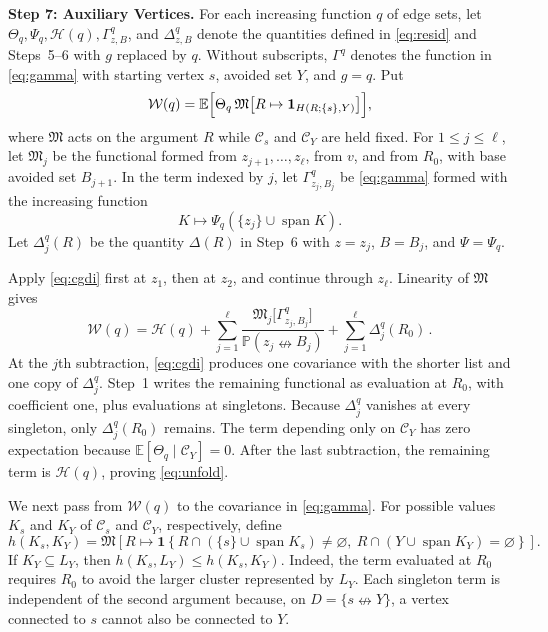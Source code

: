\documentclass[11pt]{article}
\theoremstyle{definition}
\theoremstyle{remark}
\newcommand{\PP}{\mathbb P}
\newcommand{\EE}{\mathbb E}
\newcommand{\one}{\mathbf 1}
\newcommand{\ncon}{\nleftrightarrow}
\newcommand{\eC}{\mathcal C}
\DeclareMathOperator{\spn}{span}
\newcommand{\Marg}{\mathfrak M}
\begin{document}
\medskip\noindent\textbf{Step 7: Auxiliary Vertices.}
For each increasing function $q$ of edge sets, let
$\Theta_q,\Psi_q,\mathcal H(q),\Gamma^q_{z,B}$, and $\Delta^q_{z,B}$ denote the quantities
defined in \eqref{eq:resid} and Steps~5--6 with $g$ replaced by $q$. Without subscripts,
$\Gamma^q$ denotes the function in \eqref{eq:gamma} with starting vertex $s$, avoided set
$Y$, and $g=q$. Put
\[
 \mathcal W(q)=\EE\Bigl[\Theta_q\,
   \Marg\bigl[R\mapsto\one_{H(R;\{s\},Y)}\bigr]\Bigr],
\]
where $\Marg$ acts on the argument $R$ while $\eC_s$ and $\eC_Y$ are held fixed. For
$1\leq j\leq\ell$, let $\Marg_j$ be the functional formed from
$z_{j+1},\ldots,z_\ell$, from $v$, and from $R_0$, with base avoided set $B_{j+1}$. In
the term indexed by $j$, let $\Gamma^q_{z_j,B_j}$ be \eqref{eq:gamma} formed with the
increasing function
\[
 K\longmapsto\Psi_q(\{z_j\}\cup\spn K).
\]
Let $\Delta^q_j(R)$ be the quantity $\Delta(R)$ in Step~6 with $z=z_j$, $B=B_j$, and
$\Psi=\Psi_q$.

Apply \eqref{eq:cgdi} first at $z_1$, then at $z_2$, and continue through $z_\ell$.
Linearity of $\Marg$ gives
\begin{equation}\label{eq:unfold}
 \mathcal W(q)=\mathcal H(q)
 +\sum_{j=1}^{\ell}\frac{\Marg_j\bigl[\Gamma^q_{z_j,B_j}\bigr]}{\PP(z_j\ncon B_j)}
 +\sum_{j=1}^{\ell}\Delta^q_j(R_0)\,.
\end{equation}
At the $j$th subtraction, \eqref{eq:cgdi} produces one covariance with the shorter list
and one copy of $\Delta^q_j$. Step~1 writes the remaining functional as evaluation at
$R_0$, with coefficient one, plus evaluations at singletons. Because $\Delta^q_j$
vanishes at every singleton, only $\Delta^q_j(R_0)$ remains. The term depending only on
$\eC_Y$ has zero expectation because $\EE[\Theta_q\mid\eC_Y]=0$. After the last
subtraction, the remaining term is $\mathcal H(q)$, proving \eqref{eq:unfold}.

We next pass from $\mathcal W(q)$ to the covariance in \eqref{eq:gamma}. For possible
values $K_s$ and $K_Y$ of $\eC_s$ and $\eC_Y$, respectively, define
\[
 h(K_s,K_Y)=
 \Marg\!\left[
 R\mapsto
 \one\!\left\{
 R\cap(\{s\}\cup\spn K_s)\neq\varnothing,\
 R\cap(Y\cup\spn K_Y)=\varnothing
 \right\}\right].
\]
If $K_Y\subseteq L_Y$, then $h(K_s,L_Y)\leq h(K_s,K_Y)$. Indeed, the term evaluated at
$R_0$ requires $R_0$ to avoid the larger cluster represented by $L_Y$. Each singleton
term is independent of the second argument because, on $D=\{s\ncon Y\}$, a vertex
connected to $s$ cannot also be connected to $Y$.
\end{document}
